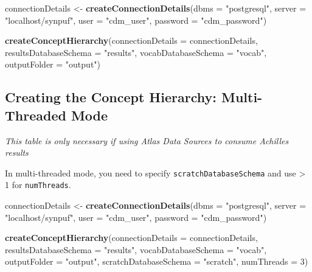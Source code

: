 \documentclass[]{article}
\newenvironment{Shaded}{\begin{snugshade}}{\end{snugshade}}
\newcommand{\KeywordTok}[1]{\textcolor[rgb]{0.13,0.29,0.53}{\textbf{#1}}}
\newcommand{\DataTypeTok}[1]{\textcolor[rgb]{0.13,0.29,0.53}{#1}}
\newcommand{\DecValTok}[1]{\textcolor[rgb]{0.00,0.00,0.81}{#1}}
\newcommand{\StringTok}[1]{\textcolor[rgb]{0.31,0.60,0.02}{#1}}
\newcommand{\NormalTok}[1]{#1}
\begin{document}
\begin{Shaded}
\begin{Highlighting}[]
\NormalTok{connectionDetails <-}\StringTok{ }\KeywordTok{createConnectionDetails}\NormalTok{(}\DataTypeTok{dbms =} \StringTok{"postgresql"}\NormalTok{, }
                                             \DataTypeTok{server =} \StringTok{"localhost/synpuf"}\NormalTok{, }
                                             \DataTypeTok{user =} \StringTok{"cdm_user"}\NormalTok{, }
                                             \DataTypeTok{password =} \StringTok{"cdm_password"}\NormalTok{)}

\KeywordTok{createConceptHierarchy}\NormalTok{(}\DataTypeTok{connectionDetails =}\NormalTok{ connectionDetails, }
                       \DataTypeTok{resultsDatabaseSchema =} \StringTok{"results"}\NormalTok{, }
                       \DataTypeTok{vocabDatabaseSchema =} \StringTok{"vocab"}\NormalTok{, }
                       \DataTypeTok{outputFolder =} \StringTok{"output"}\NormalTok{)}
\end{Highlighting}
\end{Shaded}

\subsection{Creating the Concept Hierarchy: Multi-Threaded
Mode}\label{creating-the-concept-hierarchy-multi-threaded-mode}

\emph{This table is only necessary if using Atlas Data Sources to
consume Achilles results}

In multi-threaded mode, you need to specify
\texttt{scratchDatabaseSchema} and use \textgreater{} 1 for
\texttt{numThreads}.

\begin{Shaded}
\begin{Highlighting}[]
\NormalTok{connectionDetails <-}\StringTok{ }\KeywordTok{createConnectionDetails}\NormalTok{(}\DataTypeTok{dbms =} \StringTok{"postgresql"}\NormalTok{, }
                                             \DataTypeTok{server =} \StringTok{"localhost/synpuf"}\NormalTok{, }
                                             \DataTypeTok{user =} \StringTok{"cdm_user"}\NormalTok{, }
                                             \DataTypeTok{password =} \StringTok{"cdm_password"}\NormalTok{)}

\KeywordTok{createConceptHierarchy}\NormalTok{(}\DataTypeTok{connectionDetails =}\NormalTok{ connectionDetails, }
                       \DataTypeTok{resultsDatabaseSchema =} \StringTok{"results"}\NormalTok{, }
                       \DataTypeTok{vocabDatabaseSchema =} \StringTok{"vocab"}\NormalTok{, }
                       \DataTypeTok{outputFolder =} \StringTok{"output"}\NormalTok{, }
                       \DataTypeTok{scratchDatabaseSchema =} \StringTok{"scratch"}\NormalTok{, }
                       \DataTypeTok{numThreads =} \DecValTok{3}\NormalTok{)}
\end{Highlighting}
\end{Shaded}
\end{document}
